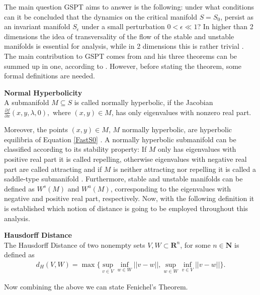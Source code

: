 	
The main question GSPT aims to answer is the following: under what conditions can it be concluded that the dynamics on the critical manifold $S=S_0$, persist as an invariant manifold $S_{\epsilon}$ under a small perturbation $0<\epsilon\ll 1$? In higher than 2 dimensions the idea of transversality of the flow of the stable and unstable manifolds is essential for analysis, while in 2 dimensions this is rather trivial \citep{MMO}. The main contribution to GSPT comes from \citet{Fenichel}  and his three theorems can be summed up in one, according to \citep{MMO}.
However, before stating the theorem, some formal definitions are needed.

\begin{definition}{\textbf{Normal Hyperbolicity \citep{firstpaper}}} \label{NormHyp}
	\\
	A submanifold $M \subseteq S$ is called normally hyperbolic, if the Jacobian $ \frac{\partial f}{\partial x}(x,y, \lambda, 0),$ where $(x,y) \in M$, has only eigenvalues with nonzero real part.
\end{definition} 

Moreover, the points $(x,y) \in M$, $M$ normally hyperbolic, are hyperbolic equilibria of Equation \ref{FastS0} \citep{MMO}.
A normally hyperbolic submanifold can be classified according to its stability property: If $M$ only has eigenvalues with positive real part it is called repelling, otherwise eigenvalues with negative real part are called attracting and if $M$ is neither attracting nor repelling it is called a saddle-type submanifold \citep{MMO}. Furthermore, stable and unstable manifolds can be defined as $W^s(M)$  and $W^u(M)$, corresponding to the eigenvalues with negative and positive real part, respectively. Now, with the following definition it is established which notion of distance is going to be employed throughout this analysis.

\begin{definition}{\textbf{Hausdorff Distance \citep{Kuehn}}}\\
	The Hausdorff Distance of two nonempty sets $V,W \subset \mathbf{R}^n$, for some $n \in \mathbf{N}$ 
	is defined as 
	\begin{align*}
	d_H(V,W)= \max \{ \sup_{v \in V} \inf_{w \in W} || v- w ||, \sup_ {w \in W}\inf_{v \in V} || v- w ||\}.
	\end{align*}
\end{definition}

Now combining the above we can state Fenichel's Theorem.

